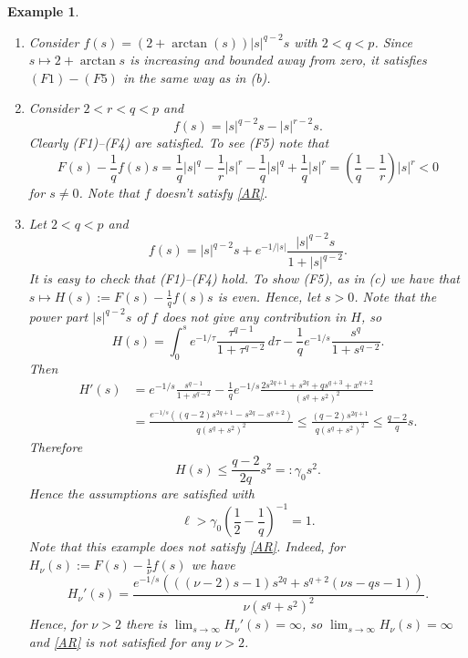 \documentclass[12pt,leqno,twoside,sort]{amsart}
\newtheorem{Ex}[Th]{Example}
\numberwithin{equation}{section}
\begin{document}
\begin{Ex}
\begin{enumerate}
    \item[(d)] Consider $f(s) = (2 + \arctan(s)) |s|^{q-2}s$ with $2 < q < p$. Since $s \mapsto 2+\arctan s$ is increasing and bounded away from zero, it satisfies $(F1)-(F5)$ in the same way as in (b).
    \item[(e)] Consider $2 < r < q < p$ and
    $$
    f(s) = |s|^{q-2}s - |s|^{r-2}s.
    $$
    Clearly (F1)--(F4) are satisfied. To see (F5) note that
    $$
    F(s) - \frac{1}{q} f(s)s = \frac1q |s|^q - \frac1r |s|^r - \frac1q |s|^q + \frac1q |s|^r = \left( \frac1q - \frac1r \right) |s|^r < 0
    $$
    for $s \neq 0$. Note that $f$ doesn't satisfy \eqref{AR}.
    \item[(f)] Let $2 < q < p$ and
    $$
    f(s) = |s|^{q-2}s + e^{-1/|s|} \frac{|s|^{q-2}s}{1 + |s|^{q-2}}.
    $$
    It is easy to check that (F1)--(F4) hold. To show (F5), as in (c) we have that $s \mapsto H(s) := F(s) - \frac{1}{q} f(s)s$ is even. Hence, let $s > 0$. Note that the power part $|s|^{q-2}s$ of $f$ does not give any contribution in $H$, so 
    $$
    H(s) = \int_0^s e^{-1/\tau} \frac{\tau^{q-1}}{1 + \tau^{q-2}} \, d\tau - \frac{1}{q} e^{-1/s} \frac{s^{q}}{1 + s^{q-2}}.
    $$
    Then
    \begin{align*}
    H'(s) &= e^{-1/s} \frac{s^{q-1}}{1 + s^{q-2}} - \frac{1}{q} e^{-1/s} \frac{2s^{2q+1} + s^{2q} + q s^{q+3} + x^{q+2}}{(s^q + s^2)^2} \\ &= \frac{e^{-1/s} \left( (q-2) s^{2q+1} - s^{2q} - s^{q+2} \right)}{q (s^q+s^2)^2} \leq \frac{(q-2) s^{2q+1}}{q (s^q+s^2)^2} \leq \frac{q-2}{q} s.
    \end{align*}
    Therefore
    $$
    H(s) \leq \frac{q-2}{2q} s^2 =: \gamma_0 s^2.
    $$
    Hence the assumptions are satisfied with
    $$
    \ell > \gamma_0 \left(\frac12 - \frac1q \right)^{-1} = 1.
    $$
Note that this example does not satisfy \eqref{AR}. Indeed, for $H_\nu(s):=F(s)-\frac{1}{\nu}f(s)$ we have
\[
H_\nu'(s)=\frac{e^{-1/s}\left(((\nu-2)s - 1)s^{2q}+s^{q+2}(\nu s - qs - 1) \right)}
     {\nu(s^{q} + s^{2})^{2}}.
\]
Hence, for $\nu>2$ there is $\lim_{s\to \infty} H_\nu'(s)=\infty$, so $\lim_{s\to\infty} H_\nu(s)=\infty$ and \eqref{AR} is not satisfied for any $\nu > 2$.
\end{enumerate}
\end{Ex}
\end{document}

